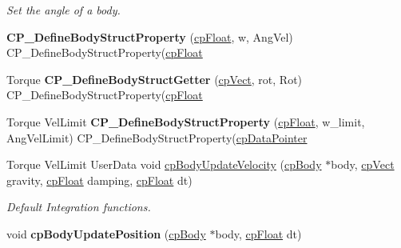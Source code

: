 \begin{DoxyCompactItemize}
\begin{DoxyCompactList}\small\item\em Set the angle of a body. \end{DoxyCompactList}\item 
\hypertarget{group__cp_body_ga7e3da7eca5ede0bb23269a43cfa99a31}{{\bfseries C\-P\-\_\-\-Define\-Body\-Struct\-Property} (\hyperlink{group__basic_types_gac1ed65573e035bf892505768c852d8d3}{cp\-Float}, w, Ang\-Vel) C\-P\-\_\-\-Define\-Body\-Struct\-Property(\hyperlink{group__basic_types_gac1ed65573e035bf892505768c852d8d3}{cp\-Float}}\label{group__cp_body_ga7e3da7eca5ede0bb23269a43cfa99a31}

\item 
\hypertarget{group__cp_body_ga9b8827fea3da8a9313e6deb15732b5d0}{Torque {\bfseries C\-P\-\_\-\-Define\-Body\-Struct\-Getter} (\hyperlink{structcp_vect}{cp\-Vect}, rot, Rot) C\-P\-\_\-\-Define\-Body\-Struct\-Property(\hyperlink{group__basic_types_gac1ed65573e035bf892505768c852d8d3}{cp\-Float}}\label{group__cp_body_ga9b8827fea3da8a9313e6deb15732b5d0}

\item 
\hypertarget{group__cp_body_ga6eed95c1d4bc6b9a7b8bba71ab550ccc}{Torque Vel\-Limit {\bfseries C\-P\-\_\-\-Define\-Body\-Struct\-Property} (\hyperlink{group__basic_types_gac1ed65573e035bf892505768c852d8d3}{cp\-Float}, w\-\_\-limit, Ang\-Vel\-Limit) C\-P\-\_\-\-Define\-Body\-Struct\-Property(\hyperlink{group__basic_types_ga2ac2c3c31e21893941f9e4f8ee279447}{cp\-Data\-Pointer}}\label{group__cp_body_ga6eed95c1d4bc6b9a7b8bba71ab550ccc}

\item 
\hypertarget{group__cp_body_ga2fad56fa6ea09ec1f1ce5811c102505a}{Torque Vel\-Limit User\-Data void \hyperlink{group__cp_body_ga2fad56fa6ea09ec1f1ce5811c102505a}{cp\-Body\-Update\-Velocity} (\hyperlink{structcp_body}{cp\-Body} $\ast$body, \hyperlink{structcp_vect}{cp\-Vect} gravity, \hyperlink{group__basic_types_gac1ed65573e035bf892505768c852d8d3}{cp\-Float} damping, \hyperlink{group__basic_types_gac1ed65573e035bf892505768c852d8d3}{cp\-Float} dt)}\label{group__cp_body_ga2fad56fa6ea09ec1f1ce5811c102505a}

\begin{DoxyCompactList}\small\item\em Default Integration functions. \end{DoxyCompactList}\item 
\hypertarget{group__cp_body_gaa42e82480140a790aabbe72b71ee929b}{void {\bfseries cp\-Body\-Update\-Position} (\hyperlink{structcp_body}{cp\-Body} $\ast$body, \hyperlink{group__basic_types_gac1ed65573e035bf892505768c852d8d3}{cp\-Float} dt)}\label{group__cp_body_gaa42e82480140a790aabbe72b71ee929b}


\end{DoxyCompactItemize}
